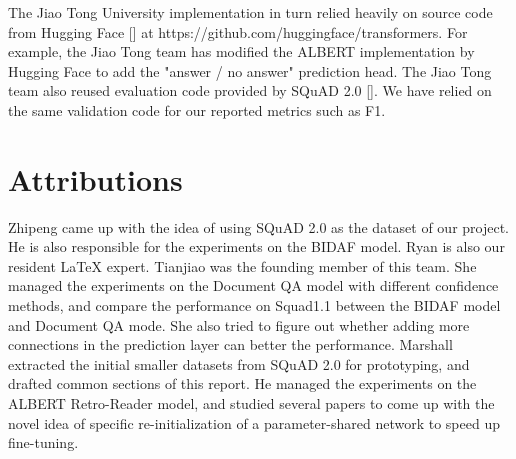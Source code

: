 \documentclass{article}
\begin{document}
The Jiao Tong University implementation in turn relied heavily on source code from Hugging Face [] at https://github.com/huggingface/transformers.  For example, the Jiao Tong team has modified the ALBERT implementation by Hugging Face to add the "answer / no answer" prediction head.  The Jiao Tong team also reused evaluation code provided by SQuAD 2.0 [].  We have relied on the same validation code for our reported metrics such as F1.



\section{Attributions}
Zhipeng came up with the idea of using SQuAD 2.0 as the dataset of our project.  He is also responsible for the experiments on the BIDAF model.  Ryan is also our resident LaTeX expert.  Tianjiao was the founding member of this team.  She managed the experiments on the Document QA model with different confidence methods, and compare the performance on Squad1.1 between the BIDAF model and Document QA mode. She also tried to figure out whether adding more connections in the prediction layer can better the performance. Marshall extracted the initial smaller datasets from SQuAD 2.0 for prototyping, and drafted common sections of this report.  He managed the experiments on the ALBERT Retro-Reader model, and studied several papers to come up with the novel idea of specific re-initialization of a parameter-shared network to speed up fine-tuning.

\newpage
\medskip

\end{document}
